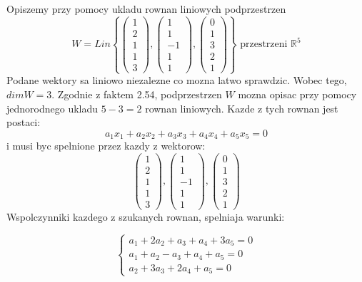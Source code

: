 \documentclass{article}
\begin{document}
Opiszemy przy pomocy ukladu rownan liniowych podprzestrzen $$W = Lin\left\{ \begin{pmatrix} 1 \\ 2 \\ 1 \\ 1 \\ 3 \end{pmatrix}, \begin{pmatrix} 1 \\ 1 \\ -1 \\ 1 \\ 1 \end{pmatrix}, \begin{pmatrix} 0 \\ 1 \\ 3 \\ 2 \\ 1 \end{pmatrix} \right\} \text{ przestrzeni } \mathbb{R}^{5}$$
Podane wektory sa liniowo niezalezne co mozna latwo sprawdzic. Wobec tego, $dimW = 3$. Zgodnie z faktem 2.54, podprzestrzen $W$ mozna opisac przy pomocy jednorodnego ukladu $5-3 = 2$ rownan liniowych. Kazde z tych rownan jest postaci:
$$a_{1}x_{1} + a_{2}x_{2} + a_{3}x_{3} + a_{4}x_{4} + a_{5}x_{5} = 0$$ 
i musi byc spelnione przez kazdy z wektorow:
$$\begin{pmatrix} 1 \\ 2 \\ 1 \\ 1 \\ 3 \end{pmatrix}, \begin{pmatrix} 1 \\ 1 \\ -1 \\ 1 \\ 1 \end{pmatrix}, \begin{pmatrix} 0 \\ 1 \\ 3 \\ 2 \\ 1 \end{pmatrix} $$
Wspolczynniki kazdego z szukanych rownan, spelniaja warunki:

$$
\begin{cases}
a_{1} + 2a_{2} + a_{3} + a_{4} + 3a_{5} = 0 \\
a_{1} + a_{2} - a_{3} + a_{4} + a_{5} = 0 \\
a_{2} + 3a_{3} + 2a_{4} + a_{5} = 0 
\end{cases}
$$
\end{document}
